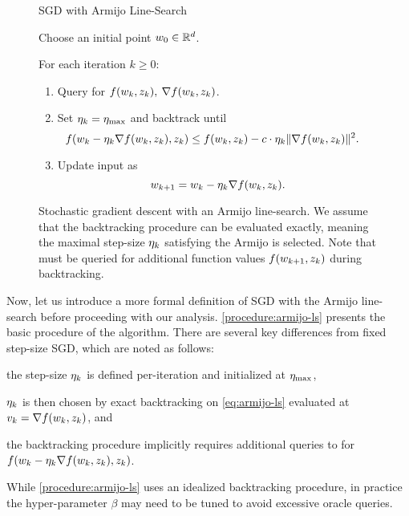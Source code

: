 \begin{figure}[t]
\begin{procedure}{\ac{SGD} with Armijo Line-Search}
\item Choose an initial point \( w_0 \in \mathbb{R}^d \).
\item For each iteration \( k \geq 0 \):
    \begin{enumerate}
        \item Query \oracle{} for \( f(w_k, z_{k}), \: \nabla f(w_k, z_{k}) \). 
        \item Set \( \eta_k =  \eta_{\text{max}} \) and backtrack until 
            \[  \hspace{-1em} f(w_k - \eta_k \nabla f(w_k, z_{k}), z_{k}) \leq f(w_k, z_{k}) - c \cdot \eta_k \|\nabla f(w_k, z_{k})\|^2. \]
        \item Update input as\vspace{-1ex}%
            \[ w_{k+1} = w_k - \eta_k \nabla f(w_k, z_{k}). \]
    \end{enumerate}
\end{procedure}
\caption{Stochastic gradient descent with an Armijo line-search. We assume that the backtracking procedure can be evaluated exactly, meaning the maximal step-size \( \eta_k \) satisfying the Armijo is selected. Note that \oracle{} must be queried for additional function values \( f(w_{k+1}, z_{k}) \) during backtracking.}%
\label{procedure:armijo-ls}
\end{figure}

Now, let us introduce a more formal definition of \ac{SGD} with the Armijo line-search before proceeding with our analysis.
\autoref{procedure:armijo-ls} presents the basic procedure of the algorithm.
There are several key differences from fixed step-size \ac{SGD}, which are noted as follows:
\begin{inparaenum}[(i)]
    \item the step-size \( \eta_k \) is defined per-iteration and initialized at \( \eta_{\text{max}} \),
    \item \( \eta_k \) is then chosen by exact backtracking on \autoref{eq:armijo-ls} evaluated at \( v_k = \nabla f(w_k, z_{k}) \), and
    \item the backtracking procedure implicitly requires additional queries to \oracle{} for \( f(w_k - \eta_k \nabla f(w_k, z_{k}), z_{k}) \).
\end{inparaenum}
While \autoref{procedure:armijo-ls} uses an idealized backtracking procedure, in practice the hyper-parameter \( \beta \) may need to be tuned to avoid excessive oracle queries. 

